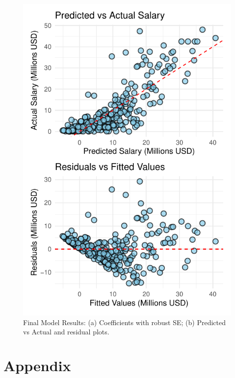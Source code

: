 \documentclass[
  11pt,
]{article}
\begin{document}
\begin{figure}[!ht]
\begin{minipage}[c]{0.48\textwidth}
  \end{minipage}
  \hfill
  \begin{minipage}[c]{0.48\textwidth}
    \centering

\includegraphics{lab2_report_short_files/figure-latex/plot-side-1.pdf}

  \end{minipage}
  \caption{Final Model Results: (a) Coefficients with robust SE; (b) Predicted vs Actual and residual plots.}
  \label{fig:final_model_side}
\end{figure}

\FloatBarrier

\hypertarget{appendix}{%
\section{Appendix}\label{appendix}}
\end{document}
